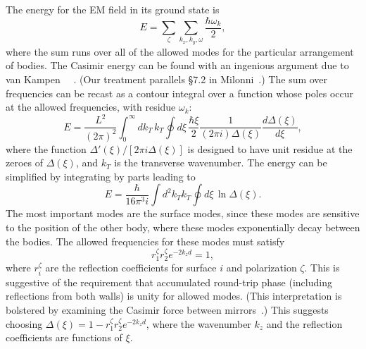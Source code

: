 The energy for the EM field in its ground state is 
\begin{equation}
  E = \sum_{\zeta}\sum_{k_x,k_y,\omega} \frac{\hbar\omega_k}{2},
\end{equation}
where the sum runs over all of the allowed modes for the particular arrangement of bodies.  
The Casimir energy can be found with an ingenious argument due to van Kampen~\etal
~\cite{vanKampen1968}.  (Our treatment parallels \S 7.2 in Milonni~\cite{Milonni1994}.)
The sum over frequencies can be recast as a contour integral over a function whose poles occur at the allowed
frequencies, with residue $\omega_k$:  
\begin{equation}
  E = \frac{L^2}{(2\pi)^2}\int_0^\infty dk_T\,k_T\oint d\xi\, \frac{\hbar \xi}{2} \frac{1}{(2\pi i)\Delta(\xi)}\frac{d\Delta(\xi)}{d\xi},
\end{equation}
where the function $\Delta'(\xi)/[2\pi i\Delta(\xi)]$ is designed to have unit residue at the zeroes of $\Delta(\xi)$, 
and $k_T$ is the transverse wavenumber.  
The energy can be simplified by integrating by parts leading to 
\begin{equation}
  E = \frac{\hbar}{16\pi^3 i}\int d^2k_Tk_T\oint d\xi \, \ln\Delta(\xi).
\end{equation}
The most important modes are the surface modes, since these modes are sensitive to the position of the other body, where
these modes exponentially decay between the bodies.    The allowed frequencies for these modes must 
satisfy 
\begin{equation}
  r^{\zeta}_1r^{\zeta}_2 e^{-2k_z d}=1,
\end{equation}
where $r^\zeta_i$ are the reflection coefficients for surface $i$ and polarization $\zeta$.
This is suggestive of the requirement that accumulated round-trip phase (including reflections from both walls) is unity for
allowed modes.  (This interpretation is bolstered by examining the Casimir force between mirrors~\cite{Genet2003}.)
This suggests choosing $\Delta(\xi) = 1-r^{\zeta}_1r^{\zeta}_2 e^{-2k_z d}$, where the wavenumber $k_z$
and the reflection coefficients are functions of $\xi$.  



